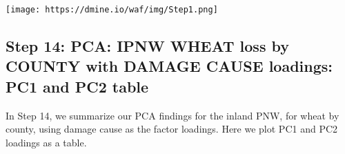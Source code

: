 \documentclass[]{article}
\newenvironment{Shaded}{\begin{snugshade}}{\end{snugshade}}
\newcommand{\CommentTok}[1]{\textcolor[rgb]{0.56,0.35,0.01}{\textit{#1}}}
\newcommand{\DataTypeTok}[1]{\textcolor[rgb]{0.13,0.29,0.53}{#1}}
\newcommand{\DecValTok}[1]{\textcolor[rgb]{0.00,0.00,0.81}{#1}}
\newcommand{\KeywordTok}[1]{\textcolor[rgb]{0.13,0.29,0.53}{\textbf{#1}}}
\newcommand{\NormalTok}[1]{#1}
\newcommand{\OperatorTok}[1]{\textcolor[rgb]{0.81,0.36,0.00}{\textbf{#1}}}
\newcommand{\StringTok}[1]{\textcolor[rgb]{0.31,0.60,0.02}{#1}}
\begin{document}
\hypertarget{htmlwidget-390322772dc11ff07b2e}{}

\texttt{[image: https://dmine.io/waf/img/Step1.png]}

\hypertarget{step-14-pca-ipnw-wheat-loss-by-county-with-damage-cause-loadings-pc1-and-pc2-table}{%
\subsection{Step 14: PCA: IPNW WHEAT loss by COUNTY with DAMAGE CAUSE
loadings: PC1 and PC2
table}\label{step-14-pca-ipnw-wheat-loss-by-county-with-damage-cause-loadings-pc1-and-pc2-table}}

In Step 14, we summarize our PCA findings for the inland PNW, for wheat
by county, using damage cause as the factor loadings. Here we plot PC1
and PC2 loadings as a table.

\begin{Shaded}
\end{Shaded}
\end{document}
